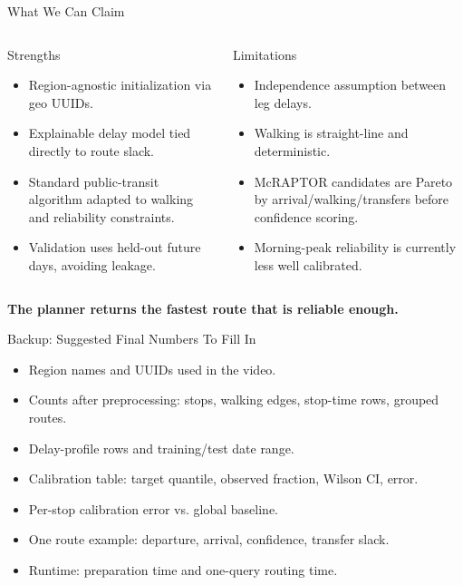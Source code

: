 \documentclass[aspectratio=169,11pt]{beamer}
\begin{document}
\begin{frame}{What We Can Claim}
  \small
  \begin{columns}[T,onlytextwidth]
      \begin{block}{Strengths}
        \begin{itemize}
          \item Region-agnostic initialization via geo UUIDs.
          \item Explainable delay model tied directly to route slack.
          \item Standard public-transit algorithm adapted to walking and reliability constraints.
          \item Validation uses held-out future days, avoiding leakage.
        \end{itemize}
      \end{block}

      \begin{alertblock}{Limitations}
        \begin{itemize}
          \item Independence assumption between leg delays.
          \item Walking is straight-line and deterministic.
          \item McRAPTOR candidates are Pareto by arrival/walking/transfers before confidence scoring.
          \item Morning-peak reliability is currently less well calibrated.
        \end{itemize}
      \end{alertblock}
  \end{columns}

  \vspace{2mm}
  \begin{center}
    \normalsize\bfseries
    The planner returns the fastest route that is reliable enough.
  \end{center}
\end{frame}

\appendix
\begin{frame}{Backup: Suggested Final Numbers To Fill In}
  \begin{itemize}
    \item Region names and UUIDs used in the video.
    \item Counts after preprocessing: stops, walking edges, stop-time rows, grouped routes.
    \item Delay-profile rows and training/test date range.
    \item Calibration table: target quantile, observed fraction, Wilson CI, error.
    \item Per-stop calibration error vs. global baseline.
    \item One route example: departure, arrival, confidence, transfer slack.
    \item Runtime: preparation time and one-query routing time.
  \end{itemize}
\end{frame}
\end{document}
